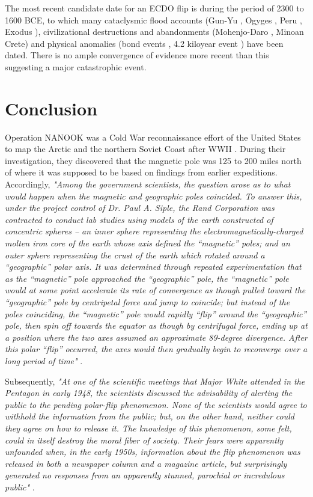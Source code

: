 \documentclass[10pt,twocolumn,letterpaper]{article}
\begin{document}
The most recent candidate date for an ECDO flip is during the period of 2300 to 1600 BCE, to which many cataclysmic flood accounts (Gun-Yu \cite{113,114,115}, Ogyges \cite{116,117}, Peru \cite{118,119}, Exodus \cite{120}), civilizational destructions and abandonments (Mohenjo-Daro \cite{121}, Minoan Crete\cite{100,101}) and physical anomalies (bond events \cite{122}, 4.2 kiloyear event \cite{90}) have been dated. There is no ample convergence of evidence more recent than this suggesting a major catastrophic event.

\section{Conclusion}

Operation NANOOK was a Cold War reconnaissance effort of the United States to map the Arctic and the northern Soviet Coast after WWII \cite{137}. During their investigation, they discovered that the magnetic pole was 125 to 200 miles north of where it was supposed to be based on findings from earlier expeditions. Accordingly, \textit{"Among the government scientists, the question arose as to what would happen when the magnetic and geographic poles coincided. To answer this, under the project control of Dr. Paul A. Siple, the Rand Corporation was contracted to conduct lab studies using models of the earth constructed of concentric spheres – an inner sphere representing the electromagnetically-charged molten iron core of the earth whose axis defined the “magnetic” poles; and an outer sphere representing the crust of the earth which rotated around a “geographic” polar axis. It was determined through repeated experimentation that as the “magnetic” pole approached the “geographic” pole, the “magnetic” pole would at some point accelerate its rate of convergence as though pulled toward the “geographic” pole by centripetal force and jump to coincide; but instead of the poles coinciding, the “magnetic” pole would rapidly “flip” around the “geographic” pole, then spin off towards the equator as though by centrifugal force, ending up at a position where the two axes assumed an approximate 89-degree divergence. After this polar “flip” occurred, the axes would then gradually begin to reconverge over a long period of time"} \cite{138,139}.

Subsequently, \textit{"At one of the scientific meetings that Major White attended in the Pentagon in early 1948, the scientists discussed the advisability of alerting the public to the pending polar-flip phenomenon. None of the scientists would agree to withhold the information from the public; but, on the other hand, neither could they agree on how to release it. The knowledge of this phenomenon, some felt, could in itself destroy the moral fiber of society. Their fears were apparently unfounded when, in the early 1950s, information about the flip phenomenon was released in both a newspaper column and a magazine article, but surprisingly generated no responses from an apparently stunned, parochial or incredulous public"} \cite{138,139}.
\end{document}
